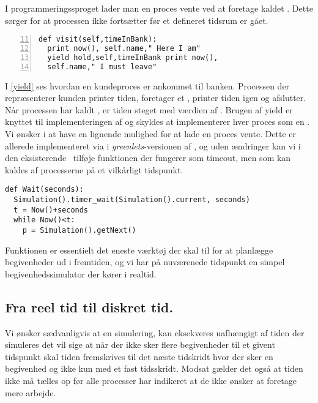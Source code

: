 
I programmeringssproget \simpy lader man en proces vente ved at
foretage kaldet . Dette  sørger for at processen ikke
fortsætter før et defineret tidsrum er gået.

\begin{lstlisting}[firstnumber=11 , stepnumber=2, numbers=left,float=hbtp, label=yield, caption= Et yield i \simpy (Taget fra Bank05.py i eksemplet fra \simpy)] 
def visit(self,timeInBank): 
  print now(), self.name," Here I am" 
  yield hold,self,timeInBank print now(),
  self.name," I must leave" 
\end{lstlisting}

I \cref{yield} ses hvordan en kundeproces er ankommet til banken. Processen der repræsenterer kunden printer tiden, foretager et , printer tiden igen og afslutter. 
 Når processen har kaldt , er tiden steget med værdien af . Brugen af yield er knyttet til implementeringen af \simpy og skyldes at \simpy implementerer hver proces som en . Vi ønsker i \pycsp at have en
lignende mulighed for at lade en proces vente. Dette er allerede implementeret via  i \emph{greenlets}-versionen af \pycsp, og uden ændringer kan vi
 i den eksisterende \sched ~tilføje funktionen  der fungerer som timeout, men som kan kaldes af processerne
på et vilkårligt tidspunkt. 

\begin{lstlisting}[firstnumber=20,float=hbtp, label=wait, caption=Wait i simuleringsversionen.] 
def Wait(seconds): 
  Simulation().timer_wait(Simulation().current, seconds) 
  t = Now()+seconds
  while Now()<t: 
    p = Simulation().getNext() 
\end{lstlisting}

Funktionen  er essentielt det eneste værktøj der skal til for at planlægge begivenheder ud i fremtiden, og vi har på nuværenede tidspunkt en simpel begivenhedssimulator der kører i realtid. 

\subsection{Fra reel tid til diskret tid.}\label{sec:discrete}
Vi ønsker sædvanligvis at en simulering, kan eksekveres uafhængigt af tiden der simuleres det vil sige at når der ikke sker flere begivenheder til et givent tidspunkt skal tiden fremskrives til det næste tidskridt hvor der sker en begivenhed og ikke kun med et fast tidsskridt. Modsat gælder det også at tiden ikke må tælles op før alle processer har indikeret at de ikke ønsker at foretage mere arbejde. 

